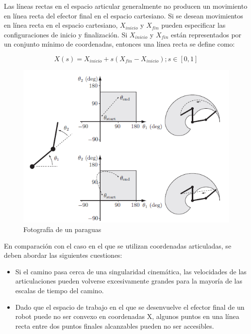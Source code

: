             Las líneas rectas en el espacio articular generalmente no producen un movimiento en línea recta del efector final en el espacio cartesiano. Si se desean movimientos en línea recta en el espacio cartesiano, $X_{inicio}$ y $X_{fin}$ pueden especificar las configuraciones de inicio y finalización. Si $X_{inicio}$ y $X_{fin}$ están representados por un conjunto mínimo de coordenadas, entonces una línea recta se define como:
            
            \begin{equation}
                X(s)= X_{inicio} + s(X_{fin}-X_{inicio}) ; s \in [0,1]
                \label{eq:cap4_tray_12}
             \end{equation}    
                
            \begin{figure}[htb]
                \centering
                \includegraphics[width=1\linewidth]{Main/Chapter4/Images4/cap4_tray_7.png}
                \caption{Fotografía de un paraguas}
                \label{f:Cap4_tray_7}
            \end{figure}  
            
        En comparación con el caso en el que se utilizan coordenadas articuladas, se deben abordar las siguientes cuestiones:
        \begin{itemize}
                \item Si el camino pasa cerca de una singularidad cinemática, las velocidades de las articulaciones pueden volverse excesivamente grandes para la mayoría de las escalas de tiempo del camino.
                \item Dado que el espacio de trabajo en el que se desenvuelve el efector final de un robot puede no ser convexo en coordenadas X, algunos puntos en una línea recta entre dos puntos finales alcanzables pueden no ser accesibles. 
        \end{itemize}

